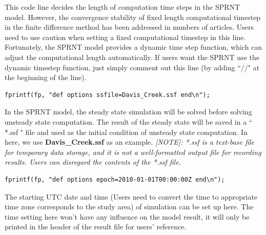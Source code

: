 \documentclass[12pt, letterpaper]{article}
\newcommand{\add}[1]{\textcolor{blue}{#1}}
\begin{document}
\begin{appendices}
\begin{flushleft}
This code line decides the length of computation time steps in the SPRNT model. However, the convergence stability of fixed length computational timestep in the finite difference method has been addressed in numbers of articles. %
Users need to use caution when setting a fixed computational timestep in this line. 
Fortunately, the SPRNT model provides a dynamic time step function, which can adjust the computational length automatically. If users want the SPRNT use the dynamic timestep function, just simply comment out this line (by adding ``//" at the beginning of the line).
\newline
{}
\lstset{showstringspaces=false}
\begin{lstlisting}[frame=single]
fprintf(fp, "def options ssfile=Davis_Creek.ssf end\n");
\end{lstlisting}
In the SPRNT model, the steady state simulation will be solved before solving unsteady state computation. The result of the steady state will be saved in a `` *.ssf " file and used as the initial condition of unsteady state computation. In here, we use \textbf{Davis\_Creek.ssf} as an example.
\newline
\emph{[NOTE]: *.ssf is a text-base file for temporary data storage, and it is not a well-formatted output file for recording results. Users can disregard the contents of the *.ssf file.}
\newline
{}
\lstset{showstringspaces=false}
\begin{lstlisting}[frame=single]
fprintf(fp, "def options epoch=2010-01-01T00:00:00Z end\n");
\end{lstlisting}
The starting UTC date and time (Users need to convert the time to appropriate time zone corresponds to the study area) of simulation can be set up here. The time setting here won't have any influence on the model result, it will only be printed in the header of the result file for users' reference.


\end{flushleft}
\end{appendices}
\end{document}
